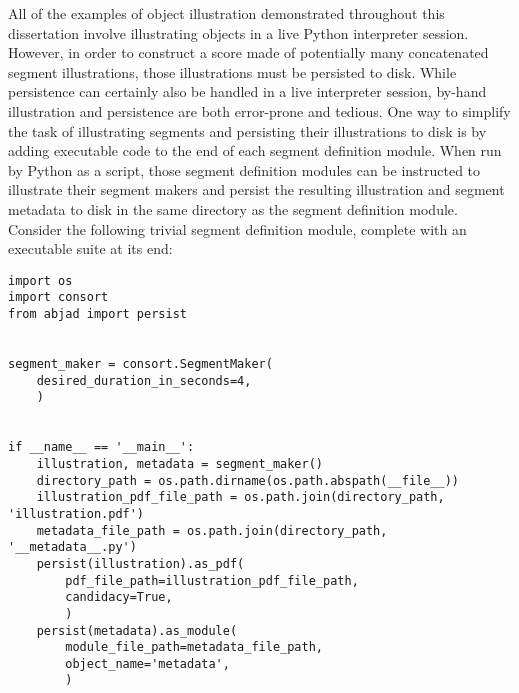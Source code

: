 All of the examples of object illustration demonstrated throughout this
dissertation involve illustrating objects in a live Python interpreter session.
However, in order to construct a score made of potentially many concatenated
segment illustrations, those illustrations must be persisted to disk. While
persistence can certainly also be handled in a live interpreter session,
by-hand illustration and persistence are both error-prone and tedious. One way
to simplify the task of illustrating segments and persisting their
illustrations to disk is by adding executable code to the end of each segment
definition module. When run by Python as a script, those segment definition
modules can be instructed to illustrate  their segment makers and persist the
resulting illustration and segment metadata to disk in the same directory as
the segment definition module. Consider the following trivial segment
definition module, complete with an executable suite at its end:

\begin{singlespacing}
\vspace{-0.5\baselineskip}
\begin{verbatim}
import os
import consort
from abjad import persist


segment_maker = consort.SegmentMaker(
    desired_duration_in_seconds=4,
    )


if __name__ == '__main__':
    illustration, metadata = segment_maker()
    directory_path = os.path.dirname(os.path.abspath(__file__))
    illustration_pdf_file_path = os.path.join(directory_path, 'illustration.pdf')
    metadata_file_path = os.path.join(directory_path, '__metadata__.py')
    persist(illustration).as_pdf(
        pdf_file_path=illustration_pdf_file_path,
        candidacy=True,
        )
    persist(metadata).as_module(
        module_file_path=metadata_file_path,
        object_name='metadata',
        )
\end{verbatim}
\end{singlespacing}

